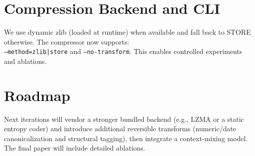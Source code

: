 \documentclass[11pt]{article}
\begin{document}
\section{Compression Backend and CLI}
We use dynamic zlib (loaded at runtime) when available and fall back to STORE otherwise. The compressor now supports:\\
\texttt{--method=zlib|store} and \texttt{--no-transform}. This enables controlled experiments and ablations.

\section{Roadmap}
Next iterations will vendor a stronger bundled backend (e.g., LZMA or a static entropy coder) and introduce additional reversible transforms (numeric/date canonicalization and structural tagging), then integrate a context-mixing model. The final paper will include detailed ablations.
\end{document}
